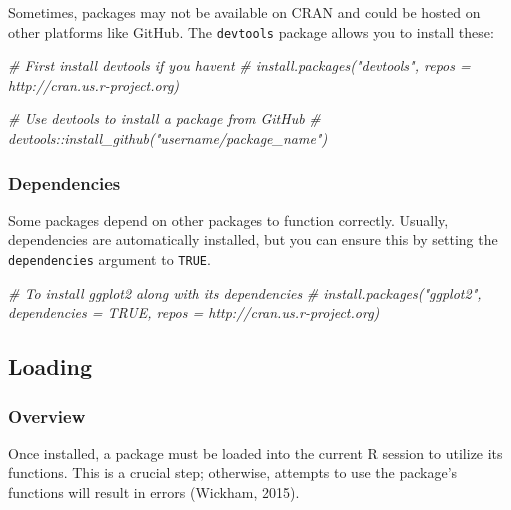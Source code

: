 \documentclass[
  b5paper]{book}
\newenvironment{Shaded}{\begin{snugshade}}{\end{snugshade}}
\newcommand{\CommentTok}[1]{\textcolor[rgb]{0.56,0.35,0.01}{\textit{#1}}}
\begin{document}
Sometimes, packages may not be available on CRAN and could be hosted on other platforms like GitHub. The \texttt{devtools} package allows you to install these:

\begin{Shaded}
\begin{Highlighting}[]
\CommentTok{\# First install devtools if you haven\textquotesingle{}t}
\CommentTok{\# install.packages("devtools", repos = \textquotesingle{}http://cran.us.r{-}project.org\textquotesingle{})}

\CommentTok{\# Use devtools to install a package from GitHub}
\CommentTok{\# devtools::install\_github("username/package\_name")}
\end{Highlighting}
\end{Shaded}

\hypertarget{dependencies}{%
\subsubsection*{Dependencies}\label{dependencies}}

Some packages depend on other packages to function correctly. Usually, dependencies are automatically installed, but you can ensure this by setting the \texttt{dependencies} argument to \texttt{TRUE}.

\begin{Shaded}
\begin{Highlighting}[]
\CommentTok{\# To install ggplot2 along with its dependencies}
\CommentTok{\# install.packages("ggplot2", dependencies = TRUE, repos = \textquotesingle{}http://cran.us.r{-}project.org\textquotesingle{})}
\end{Highlighting}
\end{Shaded}

\hypertarget{loading}{%
\subsection*{Loading}\label{loading}}

\hypertarget{overview-7}{%
\subsubsection*{Overview}\label{overview-7}}

Once installed, a package must be loaded into the current R session to utilize its functions. This is a crucial step; otherwise, attempts to use the package's functions will result in errors (Wickham, 2015).
\end{document}
